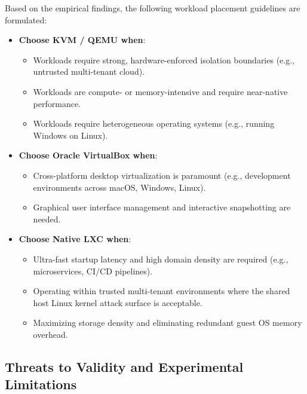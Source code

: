 Based on the empirical findings, the following workload placement guidelines are formulated:
\begin{itemize}
    \item \textbf{Choose KVM / QEMU when}:
    \begin{itemize}
        \item Workloads require strong, hardware-enforced isolation boundaries (e.g., untrusted multi-tenant cloud).
        \item Workloads are compute- or memory-intensive and require near-native performance.
        \item Workloads require heterogeneous operating systems (e.g., running Windows on Linux).
    \end{itemize}
    \item \textbf{Choose Oracle VirtualBox when}:
    \begin{itemize}
        \item Cross-platform desktop virtualization is paramount (e.g., development environments across macOS, Windows, Linux).
        \item Graphical user interface management and interactive snapshotting are needed.
    \end{itemize}
    \item \textbf{Choose Native LXC when}:
    \begin{itemize}
        \item Ultra-fast startup latency and high domain density are required (e.g., microservices, CI/CD pipelines).
        \item Operating within trusted multi-tenant environments where the shared host Linux kernel attack surface is acceptable.
        \item Maximizing storage density and eliminating redundant guest OS memory overhead.
    \end{itemize}
\end{itemize}

\subsection{Threats to Validity and Experimental Limitations}
\label{subsec:threats_to_validity}

